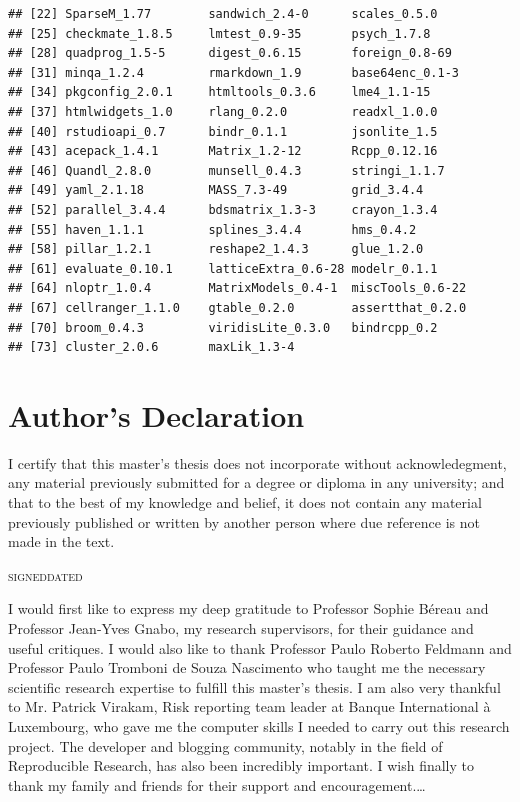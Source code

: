 \documentclass[12pt,]{article}
\begin{document}
\begin{verbatim}
## [22] SparseM_1.77        sandwich_2.4-0      scales_0.5.0       
## [25] checkmate_1.8.5     lmtest_0.9-35       psych_1.7.8        
## [28] quadprog_1.5-5      digest_0.6.15       foreign_0.8-69     
## [31] minqa_1.2.4         rmarkdown_1.9       base64enc_0.1-3    
## [34] pkgconfig_2.0.1     htmltools_0.3.6     lme4_1.1-15        
## [37] htmlwidgets_1.0     rlang_0.2.0         readxl_1.0.0       
## [40] rstudioapi_0.7      bindr_0.1.1         jsonlite_1.5       
## [43] acepack_1.4.1       Matrix_1.2-12       Rcpp_0.12.16       
## [46] Quandl_2.8.0        munsell_0.4.3       stringi_1.1.7      
## [49] yaml_2.1.18         MASS_7.3-49         grid_3.4.4         
## [52] parallel_3.4.4      bdsmatrix_1.3-3     crayon_1.3.4       
## [55] haven_1.1.1         splines_3.4.4       hms_0.4.2          
## [58] pillar_1.2.1        reshape2_1.4.3      glue_1.2.0         
## [61] evaluate_0.10.1     latticeExtra_0.6-28 modelr_0.1.1       
## [64] nloptr_1.0.4        MatrixModels_0.4-1  miscTools_0.6-22   
## [67] cellranger_1.1.0    gtable_0.2.0        assertthat_0.2.0   
## [70] broom_0.4.3         viridisLite_0.3.0   bindrcpp_0.2       
## [73] cluster_2.0.6       maxLik_1.3-4
\end{verbatim}

\vspace{3cm}

\section*{Author's Declaration}

I certify that this master's thesis does not incorporate without
acknowledegment, any material previously submitted for a degree or
diploma in any university; and that to the best of my knowledge and
belief, it does not contain any material previously published or written
by another person where due reference is not made in the text.

\vspace*{3cm}

\noindent\hrulefill\hrulefill\hrulefill\hfill\hrulefill\hrulefill

\noindent\small\textsc{signed}\hfill\textsc{dated}

\newpage

\begin{acknowledgements}
\addchaptertocentry{\acknowledgementname} 
I would first like to express my deep gratitude to Professor Sophie Béreau and Professor Jean-Yves Gnabo, my research supervisors, for their guidance and useful critiques. I would also like to thank Professor Paulo Roberto Feldmann and Professor Paulo Tromboni de Souza Nascimento who taught me the necessary scientific research expertise to fulfill this master's thesis. I am also very thankful to Mr. Patrick Virakam, Risk reporting team leader at Banque International à Luxembourg, who gave me the computer skills I needed to carry out this research project. The developer and blogging community, notably in the field of Reproducible Research, has also been incredibly important. I wish finally to thank my family and friends for their support and encouragement.\ldots
\end{acknowledgements}
\end{document}
